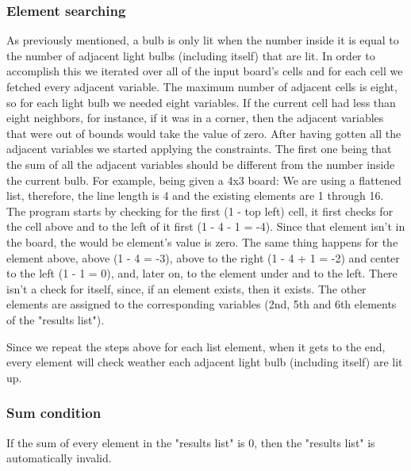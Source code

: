 \documentclass[runningheads]{llncs}
\begin{document}
\subsubsection{Element searching} \hfill \break
As previously mentioned, a bulb is only lit when the number inside it is equal to the number of adjacent light bulbs (including itself) that are lit. In order to accomplish this we iterated over all of the input board's cells and for each cell we fetched every adjacent variable. The maximum number of adjacent cells is eight, so for each light bulb we needed eight variables. If the current cell had less than eight neighbors, for instance, if it was in a corner, then the adjacent variables that were out of bounds would take the value of zero.
After having gotten all the adjacent variables we started applying the constraints. The first one being that the sum of all the adjacent variables should be different from the number inside the current bulb.
For example, being given a 4x3 board:
We are using a flattened list, therefore, the line length is 4 and the existing elements are 1 through 16.
The program starts by checking for the first (1 - top left) cell, it first checks for the cell above and to the left of it first (1 - 4 - 1 = -4). Since that element isn't in the board, the would be element's value is zero.
The same thing happens for the element above, above (1 - 4 = -3), above to the right (1 - 4 + 1 = -2) and center to the left (1 - 1 = 0), and, later on, to the element under and to the left.
There isn't a check for itself, since, if an element exists, then it exists.
The other elements are assigned to the corresponding variables (2nd, 5th and 6th elements of the "results list").

Since we repeat the steps above for each list element, when it gets to the end, every element will check weather each adjacent light bulb (including itself) are lit up.

\subsubsection*{Sum condition} \hfill \break
If the sum of every element in the "results list" is 0, then the "results list" is automatically invalid.
\end{document}
